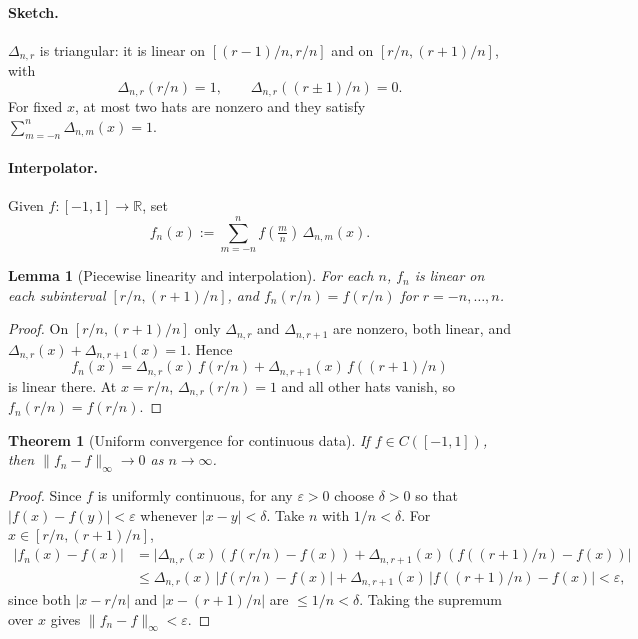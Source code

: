 \documentclass[11pt,a4paper]{article}
\newtheorem{theorem}{Theorem}
\theoremstyle{definition}
\theoremstyle{definition}
\theoremstyle{plain}
\newtheorem{lemma}[exercise]{Lemma}
\theoremstyle{remark}
\begin{document}
\paragraph{Sketch.}
$\Delta_{n,r}$ is triangular: it is linear on $[(r-1)/n,r/n]$ and on $[r/n,(r+1)/n]$, with
\[
\Delta_{n,r}(r/n)=1,\qquad \Delta_{n,r}((r\pm1)/n)=0.
\]
For fixed $x$, at most two hats are nonzero and they satisfy
$\sum_{m=-n}^n \Delta_{n,m}(x)=1$.

\paragraph{Interpolator.}
Given $f:[-1,1]\to\mathbb R$, set
\[
f_n(x):=\sum_{m=-n}^{n} f\!\left(\tfrac{m}{n}\right)\,\Delta_{n,m}(x).
\]

\begin{lemma}[Piecewise linearity and interpolation]
	For each $n$, $f_n$ is linear on each subinterval $[r/n,(r+1)/n]$, and
	$f_n(r/n)=f(r/n)$ for $r=-n,\dots,n$.
\end{lemma}

\begin{proof}
	On $[r/n,(r+1)/n]$ only $\Delta_{n,r}$ and $\Delta_{n,r+1}$ are nonzero, both linear, and
	$\Delta_{n,r}(x)+\Delta_{n,r+1}(x)=1$. Hence
	\[
	f_n(x)=\Delta_{n,r}(x)\,f(r/n)+\Delta_{n,r+1}(x)\,f((r+1)/n)
	\]
	is linear there. At $x=r/n$, $\Delta_{n,r}(r/n)=1$ and all other hats vanish, so $f_n(r/n)=f(r/n)$.
\end{proof}

\begin{theorem}[Uniform convergence for continuous data]
	If $f\in C([-1,1])$, then $\|f_n-f\|_\infty\to 0$ as $n\to\infty$.
\end{theorem}

\begin{proof}
	Since $f$ is uniformly continuous, for any $\varepsilon>0$ choose $\delta>0$ so that
	$|f(x)-f(y)|<\varepsilon$ whenever $|x-y|<\delta$. Take $n$ with $1/n<\delta$.
	For $x\in[r/n,(r+1)/n]$,
	\[
	\begin{aligned}
		|f_n(x)-f(x)|
		&=\big|\Delta_{n,r}(x)(f(r/n)-f(x))+\Delta_{n,r+1}(x)(f((r+1)/n)-f(x))\big|\\
		&\le \Delta_{n,r}(x)\,|f(r/n)-f(x)|
		+\Delta_{n,r+1}(x)\,|f((r+1)/n)-f(x)|
		< \varepsilon,
	\end{aligned}
	\]
	since both $|x-r/n|$ and $|x-(r+1)/n|$ are $\le 1/n<\delta$. Taking the supremum over $x$ gives
	$\|f_n-f\|_\infty<\varepsilon$.
\end{proof}
\end{document}
